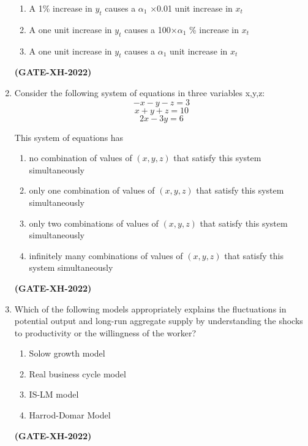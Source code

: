 \documentclass[journal]{IEEEtran}
\begin{document}
\begin{enumerate}
\begin{enumerate}
\item A 1\% increase in $y_t$ causes a $\alpha_1$ ×0.01 unit increase in $x_t$
 
\item A one unit increase in $y_t$ causes a 100×$\alpha_1$ \% increase in $x_t$
 
\item A one unit increase in $y_t$ causes a  $\alpha_1$ unit increase in $x_t$
 
\end{enumerate}
\hfill\textbf{(GATE-XH-2022)}
\item Consider the following system of equations in three variables x,y,z:\\
\begin{equation*}
    -x-y-z=3
\end{equation*}
\begin{equation*}
    x+y+z=10
\end{equation*}
\begin{equation*}
    2x-3y=6
\end{equation*}

This system of equations has
\begin{enumerate}
\item no combination of values of $(x,y,z)$ that satisfy this system simultaneously
\item only one combination of values of $(x,y,z)$ that satisfy this system simultaneously
\item only two combinations of values of $(x,y,z)$ that satisfy this system simultaneously
\item infinitely many combinations of values of $(x,y,z)$ that satisfy this system simultaneously
\end{enumerate}
\hfill\textbf{(GATE-XH-2022)}

\item Which of the following models appropriately explains the fluctuations in potential output and long-run aggregate supply by understanding the shocks to productivity or the willingness of the worker?
\begin{multicols}{2}
\begin{enumerate}
\item Solow growth model
\item Real business cycle model
\item IS-LM model
\item Harrod-Domar Model
\end{enumerate}
\end{multicols}
\hfill\textbf{(GATE-XH-2022)}


\end{enumerate}
\end{document}
